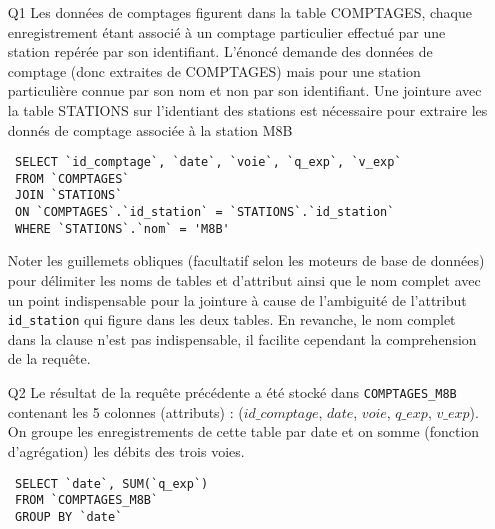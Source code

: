 \begin{itemize}
 \item[Q1] Les données de comptages figurent dans la table COMPTAGES, chaque enregistrement étant associé à un comptage particulier effectué par une station repérée par son identifiant. L'énoncé  demande des données de comptage (donc extraites de COMPTAGES) mais pour une station particulière connue par son nom et non par son identifiant. Une jointure avec la table STATIONS sur l'identiant des stations est nécessaire pour extraire les donnés de comptage associée à la station M8B
\begin{verbatim}
 SELECT `id_comptage`, `date`, `voie`, `q_exp`, `v_exp`
 FROM `COMPTAGES`
 JOIN `STATIONS`
 ON `COMPTAGES`.`id_station` = `STATIONS`.`id_station` 
 WHERE `STATIONS`.`nom` = 'M8B'
\end{verbatim}

Noter les guillemets obliques (facultatif selon les moteurs de base de données) pour délimiter les noms de tables et d'attribut ainsi que le nom complet avec un point indispensable pour la jointure à cause de l'ambiguité de l'attribut \texttt{id\_station} qui figure dans les deux tables. En revanche, le nom complet dans la clause n'est pas indispensable, il facilite cependant la comprehension de la requête.

 \item[Q2] Le résultat de la requête précédente a été stocké dans \texttt{COMPTAGES\_M8B} contenant les 5 colonnes (attributs) : ($id\_comptage$, $date$, $voie$, $q\_exp$, $v\_exp$). On groupe les enregistrements de cette table par date et on somme (fonction d'agrégation) les débits des trois voies. 
\begin{verbatim}
 SELECT `date`, SUM(`q_exp`)
 FROM `COMPTAGES_M8B` 
 GROUP BY `date`
\end{verbatim}

\end{itemize}
